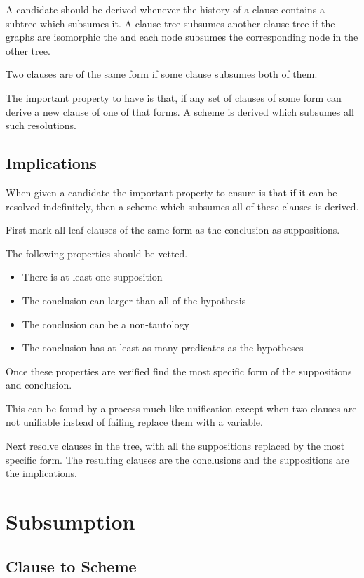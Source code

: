 \documentclass{article}
\begin{document}
A candidate should be derived whenever the history of a clause contains a subtree which subsumes it.
A clause-tree subsumes another clause-tree
  if the graphs are isomorphic the and each node subsumes the corresponding node in the other tree.

Two clauses are of the same form if some clause subsumes both of them.

The important property to have is that,
if any set of clauses of some form can derive a new clause of one of that forms.
A scheme is derived which subsumes all such resolutions.

\subsection{Implications}

When given a candidate the important property to ensure is that if it can be resolved indefinitely,
then a scheme which subsumes all of these clauses is derived.

First mark all leaf clauses of the same form as the conclusion as suppositions.

The following properties should be vetted.
\begin{itemize}
  \item There is at least one supposition
  \item The conclusion can larger than all of the hypothesis
  \item The conclusion can be a non-tautology
  \item The conclusion has at least as many predicates as the hypotheses
\end{itemize}

Once these properties are verified find the most specific form of the suppositions and conclusion.

This can be found by a process much like unification except when two clauses are not unifiable instead 
  of failing replace them with a variable.

Next resolve clauses in the tree, with all the suppositions replaced by the most specific form.
The resulting clauses are the conclusions and the suppositions are the implications.


\section{Subsumption}

\subsection{Clause to Scheme}
  
\end{document}
